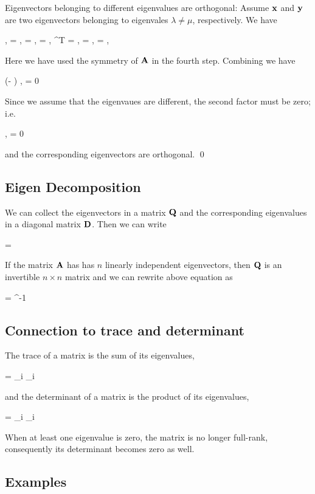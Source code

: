 Eigenvectors belonging to different eigenvalues are orthogonal: Assume $\mathbf{x}$ and $\mathbf{y}$ are two eigenvectors belonging to eigenvales $\lambda \neq \mu$, respectively. We have

\bee
\lambda \langle \xbf, \ybf \rangle = \langle \lambda \xbf, \ybf \rangle = \langle \Abf \xbf, \ybf \rangle = \langle \xbf , \Abf^T \ybf \rangle = \langle\xbf, \Abf\ybf\rangle = \langle\xbf, \mu \ybf\rangle = \mu \langle\xbf, \ybf\rangle
\eee

Here we have used the symmetry of $\mathbf{A}$ in the fourth step. Combining we have

\bee
(\lambda - \mu) \langle\xbf, \ybf \rangle = 0
\eee

Since we assume that the eigenvaues are different, the second factor must be zero; i.e.

\bee
\langle\xbf, \ybf\rangle = 0
\eee

and the corresponding eigenvectors are orthogonal. \qed


\subsection{Eigen Decomposition}

We can collect the eigenvectors in a matrix $\mathbf{Q}$ and the corresponding eigenvalues in a diagonal matrix $\mathbf{D}$. Then we can write

\bee
\Abf \Qbf = \Qbf \Dbf
\eee

If the matrix $\mathbf{A}$ has has $n$ linearly independent eigenvectors, then $\mathbf{Q}$ is an invertible $n \times n$ matrix and we can rewrite above equation as

\bee
\Abf = \Qbf \Dbf \Qbf^{-1}
\eee


\subsection{Connection to trace and determinant}

The trace of a matrix is the sum of its eigenvalues,

\bee
{} \Abf = \sum_i \lambda_i
\eee

and the determinant of a matrix is the product of its eigenvalues,

\bee
\det \Abf = \prod_i \lambda_i
\eee

When at least one eigenvalue is zero, the matrix is no longer full-rank, consequently its determinant becomes zero as well.

\subsection{Examples}

